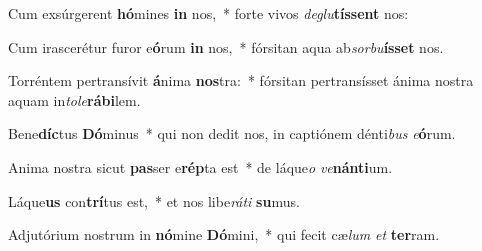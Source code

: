\item Cum exsúrgerent \textbf{hó}mines \textbf{in} nos,~* forte vivos \textit{de}\textit{glu}\textbf{tís}\textbf{sent} nos:
\item Cum irascerétur furor e\textbf{ó}rum \textbf{in} nos,~* fórsitan aqua ab\textit{sor}\textit{bu}\textbf{ís}\textbf{set} nos.
\item Torréntem pertransívit \textbf{á}nima \textbf{nos}tra:~* fórsitan pertransísset ánima nostra aquam in\textit{to}\textit{le}\textbf{rá}\textbf{bi}lem.
\item Bene\textbf{díc}tus \textbf{Dó}minus~* qui non dedit nos, in captiónem dénti\textit{bus} \textit{e}\textbf{ó}rum.
\item Anima nostra sicut \textbf{pas}ser e\textbf{rép}ta est~* de láque\textit{o} \textit{ve}\textbf{nán}\textbf{ti}um.
\item Láque\textbf{us} con\textbf{trí}tus est,~* et nos libe\textit{rá}\textit{ti} \textbf{su}mus.
\item Adjutórium nostrum in \textbf{nó}mine \textbf{Dó}mini,~* qui fecit cæ\textit{lum} \textit{et} \textbf{ter}ram.
